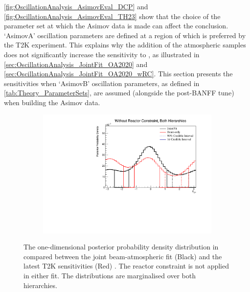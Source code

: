 \autoref{fig:OscillationAnalysis_AsimovEval_DCP} and \autoref{fig:OscillationAnalysis_AsimovEval_TH23} show that the choice of the parameter set at which the Asimov data is made can affect the conclusion. `AsimovA' oscillation parameters are defined at a region of  which is preferred by the T2K experiment. This explains why the addition of the atmospheric samples does not significantly increase the sensitivity to , as illustrated in \autoref{sec:OscillationAnalysis_JointFit_OA2020} and \autoref{sec:OscillationAnalysis_JointFit_OA2020_wRC}. This section presents the sensitivities when `AsimovB' oscillation parameters, as defined in \autoref{tab:Theory_ParameterSets}, are assumed (alongside the post-BANFF tune) when building the Asimov data.

\begin{figure}[h]
  \begin{subfigure}[t]{0.98\textwidth}
    \includegraphics[width=\textwidth, trim={0mm 0mm 0mm 0mm}, clip,page=1]{Figures/OA/JointFit_OA2020_Comp_AsimovB/ContourComparison_1D_dcp_BH_2_woRC_UnSmeared_CredibleInterval.pdf}
  \end{subfigure}
  \caption{The one-dimensional posterior probability density distribution in  compared between the joint beam-atmospheric fit (Black) and the latest T2K sensitivities (Red) \cite{Dunne2020-uf, t2k_tn_393}. The reactor constraint is not applied in either fit. The distributions are marginalised over both hierarchies.}
  \label{fig:OscillationAnalysis_JointFit_AsimovB_DCP}
\end{figure}

